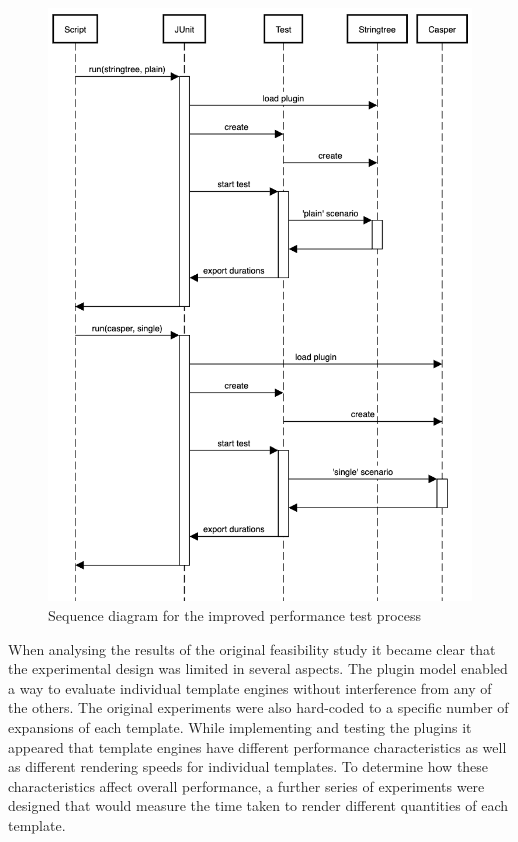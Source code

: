 \begin{figure}[ht!]
\centering
\includegraphics[scale=0.5]{Figures/newsequence.png}
\caption{Sequence diagram for the improved performance test process}
\label{comp:figure:sequence}
\end{figure}


When analysing the results of the original feasibility study it became clear that the experimental design was limited in several aspects. The plugin model enabled a way to evaluate individual \gls{template engine}s without interference from any of the others. The original experiments were also hard-coded to a specific number of expansions of each template. While implementing and testing the plugins it appeared that \gls{template engine}s have different performance characteristics as well as different rendering speeds for individual templates. To determine how these characteristics affect overall performance, a further series of experiments were designed that would measure the time taken to render different quantities of each template.

